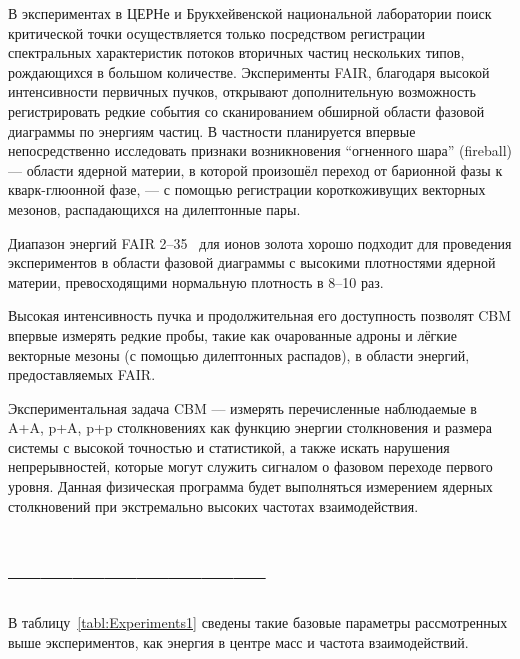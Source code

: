 В экспериментах в ЦЕРНе и Брукхейвенской национальной лаборатории поиск критической точки осуществляется только посредством регистрации спектральных характеристик потоков вторичных частиц нескольких типов, рождающихся в большом количестве. Эксперименты FAIR, благодаря высокой интенсивности первичных пучков, открывают дополнительную возможность регистрировать редкие события со сканированием обширной области фазовой диаграммы по энергиям частиц. В частности планируется впервые непосредственно исследовать признаки возникновения ``огненного шара'' (fireball) --- области ядерной материи, в которой произошёл переход от барионной фазы к кварк-глюонной фазе, --- с помощью регистрации короткоживущих векторных мезонов, распадающихся на дилептонные пары.

Диапазон энергий FAIR 2--35~\GeVperNucl{} для ионов золота хорошо подходит для проведения экспериментов в области фазовой диаграммы с высокими плотностями ядерной материи, превосходящими нормальную плотность в 8--10 раз.

Высокая интенсивность пучка и продолжительная его доступность позволят CBM впервые измерять редкие пробы, такие как очарованные адроны и лёгкие векторные мезоны (с помощью дилептонных распадов), в области энергий, предоставляемых FAIR.

Экспериментальная задача CBM --- измерять перечисленные наблюдаемые в A+A, p+A, p+p столкновениях как функцию энергии столкновения и размера системы с высокой точностью и статистикой, а также искать нарушения непрерывностей, которые могут служить сигналом о фазовом переходе первого уровня. Данная физическая программа будет выполняться измерением ядерных столкновений при экстремально высоких частотах взаимодействия.


\section{------------------------}

В таблицу~\ref{tabl:Experiments1} сведены такие базовые параметры рассмотренных выше экспериментов, как энергия в центре масс и частота взаимодействий.

